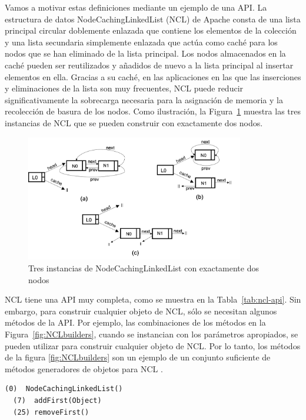 Vamos a motivar estas definiciones mediante un ejemplo de una API. La estructura de datos NodeCachingLinkedList (NCL) de Apache \cite{apache} consta de una lista principal circular doblemente enlazada  que contiene los elementos de la colección y una lista secundaria simplemente enlazada que actúa como caché para los nodos que se han eliminado de la lista principal. Los nodos almacenados en la caché pueden ser reutilizados y añadidos de nuevo a la lista principal al insertar elementos en ella. Gracias a su caché, en las aplicaciones en las que las inserciones y eliminaciones de la lista son muy frecuentes, NCL puede reducir significativamente la sobrecarga necesaria para la asignación de memoria y la recolección de basura de los nodos. 
Como ilustración, la Figura~\ref{fig:ncl-instances} muestra las tres instancias de NCL que se pueden construir con exactamente dos nodos.


\begin{figure}[H]
    \centering
    \includegraphics[width=0.85\textwidth]{NCL-instances.png}
    \caption{Tres instancias de NodeCachingLinkedList con exactamente dos nodos}
    \label{fig:ncl-instances}
\end{figure}


NCL tiene una API muy completa, como se muestra en la Tabla~\ref{tab:ncl-api}.
Sin embargo, para construir cualquier objeto de NCL, sólo se necesitan algunos
métodos de la API. Por ejemplo, las combinaciones de los métodos en la
Figura~\ref{fig:NCLbuilders}, cuando se instancian con los parámetros
apropiados, se pueden utilizar para construir cualquier objeto de NCL.
Por lo tanto, los métodos de la figura \ref{fig:NCLbuilders} son un ejemplo de un conjunto suficiente de métodos generadores de objetos para NCL .
\\
\begin{lstlisting}[numbers=none,label=fig:NCLbuilders, caption=Conjunto de metodos sufiente para NCL]
  (0)  NodeCachingLinkedList()
  (7)  addFirst(Object)
  (25) removeFirst()
\end{lstlisting}

